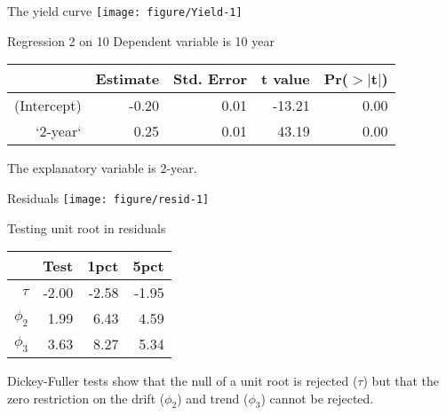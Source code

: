 \documentclass[14pt,xcolor=pdftex,dvipsnames,table]{beamer}\usepackage[]{graphicx}\usepackage[]{color}
\makeatletter
\def\maxwidth{ %
  \ifdim\Gin@nat@width>\linewidth
    \linewidth
  \else
    \Gin@nat@width
  \fi
}
\newenvironment{knitrout}{}{} %
\makeatother
\begin{document}
\begin{frame}{The yield curve}
\begin{knitrout}
\color{fgcolor}
\texttt{[image: figure/Yield-1]} 

\end{knitrout}
 \end{frame}
 
\begin{frame}{Regression 2 on 10}
Dependent variable is 10 year
\begin{table}[ht]
\centering
\begin{tabular}{rrrrr}
  \hline
 & Estimate & Std. Error & t value & Pr($>$$|$t$|$) \\ 
  \hline
(Intercept) & -0.20 & 0.01 & -13.21 & 0.00 \\ 
  `2-year` & 0.25 & 0.01 & 43.19 & 0.00 \\ 
   \hline
\end{tabular}
\end{table}

The explanatory variable is 2-year.
\end{frame}

\begin{frame}{Residuals}
\begin{knitrout}
\color{fgcolor}
\texttt{[image: figure/resid-1]} 

\end{knitrout}
\end{frame}

\begin{frame}{Testing unit root in residuals}
\begin{table}[ht]
\centering
\begin{tabular}{rrrr}
  \hline
   & Test & 1pct& 5pct  \\ 
  \hline
$\tau$ & -2.00 & -2.58 & -1.95\\
 $\phi_2$ & 1.99 & 6.43 & 4.59\\ 
$\phi_3$ & 3.63 & 8.27 & 5.34\\ 
   \hline
\end{tabular}
\end{table}
Dickey-Fuller tests  show that the null of a unit root is rejected ($\tau$) but that the zero restriction on the drift ($\phi_2$) and trend ($\phi_3$) cannot be rejected.   
\end{frame}
\end{document}
